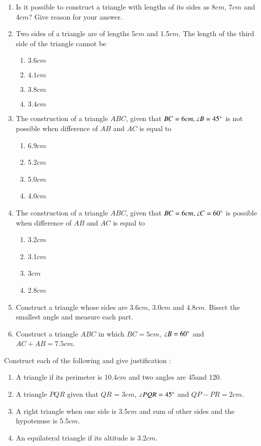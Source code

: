 \begin{enumerate}[label=\thesubsection.\arabic*,ref=\thesubsection.\theenumi]
\item Is it possible to construct a triangle with lengths of its sides as 8$cm$, 7$cm$ and 4$cm$? Give reason for your answer.

\item Two sides of a triangle are of lengths 5$cm$ and 1.5$cm$. The length of the third side of the triangle cannot be
\begin{enumerate}
\item $3.6 cm$
\item $4.1 cm$
\item $3.8 cm$
\item $3.4 cm$
\end{enumerate}
\item The construction of a triangle $ABC$, given that $BC = 6 cm, \angle B = 45\degree$ is not possible when difference of $AB$ and $AC$ is equal to
		\begin{enumerate}
			\item 6.9$cm$
			\item 5.2$cm$
			\item 5.0$cm$
			\item 4.0$cm$
		\end{enumerate}
	\item The construction of a triangle $ABC$, given that $BC = 6 cm, \angle C = 60\degree$ is possible when difference of $AB$ and $AC$ is equal to
		\begin{enumerate}
			\item 3.2$cm$
			\item 3.1$cm$
			\item 3$cm$
			\item 2.8$cm$
		\end{enumerate}
\item Construct a triangle whose sides are $3.6 cm$, $3.0 cm$ and $4.8 cm$. Bisect the smallest angle and measure each part.
\item Construct a triangle $ABC$ in which $BC = 5 cm$, $\angle B = 60\degree$ and $AC+AB = 7.5cm$.
\end{enumerate}
Construct each of the following and give justification :
\begin{enumerate}[label=\thesection.\arabic*,ref=\thesection.\theenumi,resume*]
\item A triangle if its perimeter is 10.4$cm$ and two angles are 45\degree and 120\degree.
\item A triangle $PQR$ given that $QR$ = 3$cm$, $\angle PQR = 45\degree$ and $QP - PR = 2 cm$.
\item A right triangle when one side is 3.5$cm$ and sum of other sides and the hypotenuse
is 5.5$cm$.
\item An equilateral triangle if its altitude is 3.2$cm$.
\end{enumerate}                               
